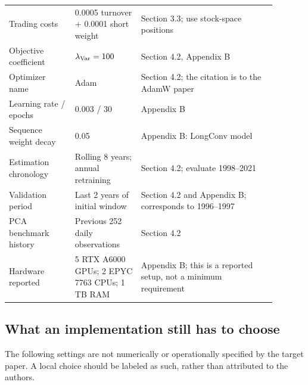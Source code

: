 \documentclass[11pt]{article}
\begin{document}
\begin{longtable}{p{0.22\linewidth}p{0.22\linewidth}p{0.45\linewidth}}
Trading costs & 0.0005 turnover + 0.0001 short weight
& Section 3.3; use stock-space positions\\
Objective coefficient & $\lambda_{\rm Var}=100$ & Section 4.2, Appendix B\\
Optimizer name & Adam & Section 4.2; the citation is to the AdamW paper\\
Learning rate / epochs & 0.003 / 30 & Appendix B\\
Sequence weight decay & 0.05 & Appendix B: LongConv model\\
Estimation chronology & Rolling 8 years; annual retraining
& Section 4.2; evaluate 1998--2021\\
Validation period & Last 2 years of initial window
& Section 4.2 and Appendix B; corresponds to 1996--1997\\
PCA benchmark history & Previous 252 daily observations & Section 4.2\\
Hardware reported & 5 RTX A6000 GPUs; 2 EPYC 7763 CPUs; 1 TB RAM
& Appendix B; this is a reported setup, not a minimum requirement\\
\bottomrule
\end{longtable}
\normalsize

\subsection{What an implementation still has to choose}

The following settings are not numerically or operationally specified
by the target paper. A local choice should be labeled as such, rather
than attributed to the authors.
\end{document}
